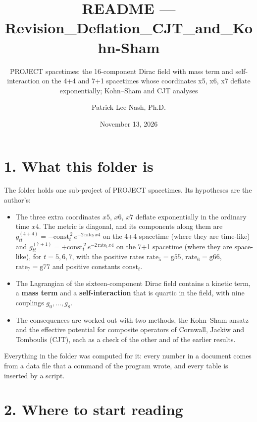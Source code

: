 \documentclass[
  10pt,
]{article}
\title{README --- Revision\_Deflation\_CJT\_and\_Kohn-Sham}
\subtitle{PROJECT spacetimes: the 16-component Dirac field with mass
term and self-interaction on the 4+4 and 7+1 spacetimes whose
coordinates x5, x6, x7 deflate exponentially; Kohn--Sham and CJT
analyses}
\author{Patrick Lee Nash, Ph.D.}
\date{November 13, 2026}
\providecommand{\tightlist}{%
  \setlength{\itemsep}{0pt}\setlength{\parskip}{0pt}}
\begin{document}
\maketitle

\hypertarget{what-this-folder-is}{%
\section{1. What this folder is}\label{what-this-folder-is}}

The folder holds one sub-project of PROJECT spacetimes. Its hypotheses
are the author's:

\begin{itemize}
\tightlist
\item
  The three extra coordinates \(x5\), \(x6\), \(x7\) deflate
  exponentially in the ordinary time \(x4\). The metric is diagonal, and
  its components along them are
  \(g^{(4+4)}_{tt}=-\mathrm{const}_t^{\,2}\,e^{-2\,\mathrm{rate}_t\,x4}\)
  on the 4+4 spacetime (where they are time-like) and
  \(g^{(7+1)}_{tt}=+\mathrm{const}_t^{\,2}\,e^{-2\,\mathrm{rate}_t\,x4}\)
  on the 7+1 spacetime (where they are space-like), for \(t=5,6,7\),
  with the positive rates \(\mathrm{rate}_5=\mathrm{g55}\),
  \(\mathrm{rate}_6=\mathrm{g66}\), \(\mathrm{rate}_7=\mathrm{g77}\) and
  positive constants \(\mathrm{const}_t\).
\item
  The Lagrangian of the sixteen-component Dirac field contains a kinetic
  term, a \textbf{mass term} and a \textbf{self-interaction} that is
  quartic in the field, with nine couplings \(g_0,\dots,g_8\).
\item
  The consequences are worked out with two methods, the Kohn--Sham
  ansatz and the effective potential for composite operators of
  Cornwall, Jackiw and Tomboulis (CJT), each as a check of the other and
  of the earlier results.
\end{itemize}

Everything in the folder was computed for it: every number in a document
comes from a data file that a command of the program wrote, and every
table is inserted by a script.

\hypertarget{where-to-start-reading}{%
\section{2. Where to start reading}\label{where-to-start-reading}}
\end{document}
